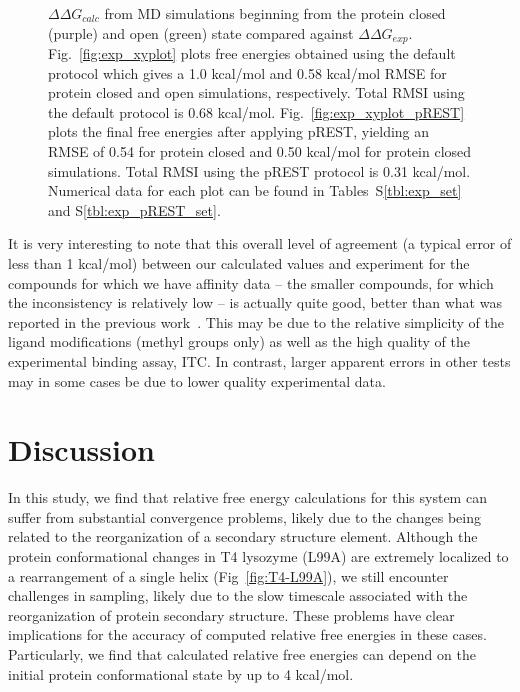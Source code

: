 \begin{figure}[H]
\begin{subfigure}{.5\textwidth}
\end{subfigure}\hfill
\caption{$\Delta\Delta G_{calc}$ from MD simulations beginning from the protein closed (purple) and open (green) state compared against $\Delta\Delta G_{exp}$.
Fig.~\ref{fig:exp_xyplot} plots free energies obtained using the default protocol which gives a 1.0 kcal/mol and 0.58 kcal/mol RMSE for protein closed and open simulations, respectively.
Total RMSI using the default protocol is 0.68 kcal/mol.
Fig.~\ref{fig:exp_xyplot_pREST} plots the final free energies after applying pREST, yielding an RMSE of 0.54 for protein closed and 0.50 kcal/mol for protein closed simulations.
Total RMSI using the pREST protocol is 0.31 kcal/mol.
Numerical data for each plot can be found in Tables~S\ref{tbl:exp_set} and S\ref{tbl:exp_pREST_set}.
}
\label{fig:exp-xyplots}
\end{figure}

It is very interesting to note that this overall level of agreement (a typical error of less than 1 kcal/mol) between our calculated values and experiment for the compounds for which we have affinity data -- the smaller compounds, for which the inconsistency is relatively low -- is actually quite good, better than what was reported in the previous work~\cite{FEPplus}.
This may be due to the relative simplicity of the ligand modifications (methyl groups only) as well as the high quality of the experimental binding assay, ITC.
In contrast, larger apparent errors in other tests may in some cases be due to lower quality experimental data.

\section{Discussion}
In this study, we find that relative free energy calculations for this system can suffer from substantial convergence problems, likely due to the changes being related to the reorganization of a secondary structure element.
Although the protein conformational changes in T4 lysozyme (L99A) are extremely localized to a rearrangement of a single helix (Fig~\ref{fig:T4-L99A}), we still encounter challenges in sampling, likely due to the slow timescale associated with the reorganization of protein secondary structure.
These problems have clear implications for the accuracy of computed relative free energies in these cases.
Particularly, we find that calculated relative free energies can depend on the initial protein conformational state by up to 4 kcal/mol.

